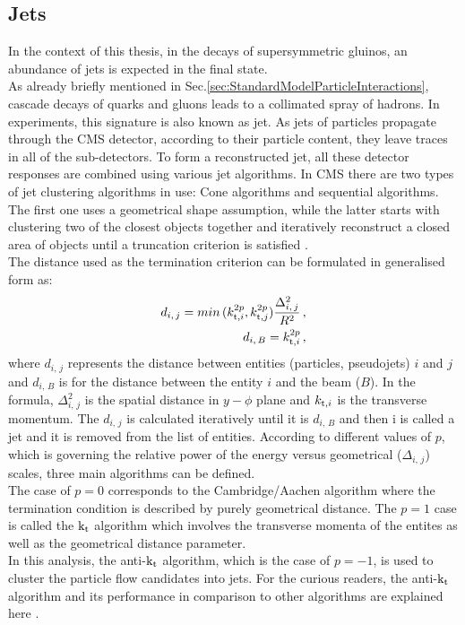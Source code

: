 \subsection{Jets}
\label{sec:PFJET}
In the context of this thesis, in the decays of supersymmetric gluinos, an abundance of jets is expected in the final state.\\
As already briefly mentioned in Sec.\ref{sec:StandardModelParticleInteractions}, cascade decays of quarks and gluons leads to a collimated spray of hadrons. In experiments, this signature is also known as jet. 
As jets of particles propagate through the CMS detector, according to their particle content, they leave traces in all of the sub-detectors. To form a reconstructed jet, all these detector responses are combined using various jet algorithms.  
In CMS there are two types of jet clustering algorithms in use: Cone algorithms and sequential algorithms. The first one uses a geometrical shape assumption, while the latter starts with clustering two of the closest objects together and iteratively reconstruct a closed area of objects until a truncation criterion is satisfied \cite{JET1}.\\
The distance used as the termination criterion can be formulated in generalised form as:
\begin{eqnarray}
{d_{i,\,j} =  min\,(k^{2p}_{{\rm t},i},k^{2p}_{{\rm t},j})\frac{\Delta^2_{i,\,j}}{R^2}}\,,\\
{d_{i,\,B}} = k^{2p}_{{\rm t},i}\,,
\end{eqnarray}
where $d_{i,\,j}$ represents the distance between entities (particles, pseudojets) $i$ and $j$ and $d_{i,\,B}$ is for the distance between the entity $i$ and the beam ($B$). In the formula, $\Delta^2_{i,\,j}$ is the spatial distance in $y-\phi$ plane and $k_{{\rm t},i}$ is the transverse momentum. The $d_{i,\,j}$ is calculated iteratively until it is $d_{i,\,B}$ and then i is called a jet and it is removed from the list of entities. According to different values of $p$, which is governing the relative power of the energy versus geometrical ($\Delta_{i,\,j}$) scales, three main algorithms can be defined.\\
The case of $p=0$ corresponds to the Cambridge/Aachen algorithm where the termination condition is described by purely geometrical distance. The $p=1$ case is called the ${\rm k_t}$ algorithm which involves the transverse momenta of the entites as well as the geometrical distance parameter. \\
In this analysis, the anti-${\rm k_t}$ algorithm, which is the case of $p=-1$, is used to cluster the particle flow candidates into jets. For the curious readers, the anti-${\rm k_t}$ algorithm and its performance in comparison to other algorithms are explained here \cite{antiKT}.\\

